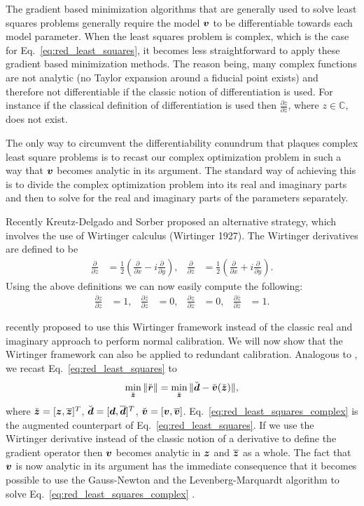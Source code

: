 \documentclass[useAMS,usenatbib]{mn2e}
\newcommand{\bz}{\bmath{z}}
\newcommand{\br}{\bmath{r}}
\newcommand{\bd}{\bmath{d}}
\newcommand{\bv}{\bmath{v}}
\newcommand{\conj}[1]{\overline{#1}}
\begin{document}
The gradient based minimization algorithms that are generally used to solve least squares problems generally require the model $\bv$ to be differentiable
towards each model parameter. When the least squares problem is complex, which is the case for Eq.~\eqref{eq:red_least_squares}, it becomes less straightforward to apply these gradient based minimization methods. The reason being,
many complex functions are not analytic (no Taylor expansion around a fiducial point exists) and therefore not differentiable if the classic notion of differentiation is used. For instance if the 
classical definition of differentiation is used then $\frac{\partial z}{\partial \conj{z}}$, where $z \in \mathbb{C}$, does not exist.

The only way to circumvent the differentiability conundrum that plaques complex least square problems is to recast our complex optimization problem in such a way that $\bv$ becomes analytic in its argument.
The standard way of achieving this is to divide the complex optimization problem into its real and imaginary parts and then to solve for the real and imaginary parts of the parameters separately.

Recently Kreutz-Delgado and Sorber proposed an alternative strategy, which involves the use of Wirtinger calculus (Wirtinger 1927). The Wirtinger derivatives 
are defined to be 
\begin{align}
\frac{\partial}{\partial z} &= \frac{1}{2}\left ( \frac{\partial}{\partial x} -  i \frac{\partial}{\partial y} \right ),&\frac{\partial}{\partial \conj{z}} &= \frac{1}{2}\left ( \frac{\partial}{\partial x} +  i \frac{\partial}{\partial y} \right ). 
\end{align}
Using the above definitions we can now easily compute the following:
\begin{align}
\frac{\partial z}{\partial z} & = 1, & \frac{\partial \conj{z}}{\partial z}&=0, & \frac{\partial z}{\partial \conj{z}} & = 0, & \frac{\partial \conj{z}}{\partial \conj{z}}&=1.
\end{align}

\citet{Smirnov2015} recently proposed to use this Wirtinger framework instead of the classic real and imaginary approach to perform normal calibration. We will now show
that the Wirtinger framework can also be applied to redundant calibration. Analogous to \cite{Smirnov2015}, we recast Eq.~\eqref{eq:red_least_squares} to 
\begin{equation}
\label{eq:red_least_squares_complex}
\min_{\breve{\bz}} \|\breve{\br}\| = \min_{\breve{\bz}} \|\breve{\bd} - \breve{\bv}(\breve{\bz})\|, 
\end{equation}
where $\breve{\bz} = [\bz,\conj{\bz}]^T$, $\breve{\bd} = [\bd,\conj{\bd}]^T$, $\breve{\bv} = [\bv,\conj{\bv}]$. Eq.~\eqref{eq:red_least_squares_complex} is the augmented counterpart of Eq.~\eqref{eq:red_least_squares}.
If we use the Wirtinger derivative instead of the classic notion of a derivative to define the gradient operator then 
$\bv$ becomes analytic in $\bz$ and $\conj{\bz}$ as a whole. The fact that $\bv$ is now analytic in its argument has the immediate consequence that it becomes possible to use the Gauss-Newton
and the Levenberg-Marquardt algorithm to solve Eq.~\eqref{eq:red_least_squares_complex} \citep{Smirnov2015}.
\end{document}
